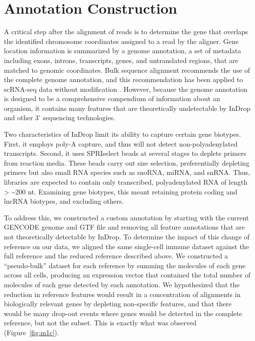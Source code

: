 \section{Annotation Construction}

A critical step after the alignment of reads is to determine the gene that overlaps the identified chromosome coordinates assigned to a read by the aligner. 
Gene location information is summarized by a genome annotation, a set of metadata including exons, introns, transcripts, genes, and untranslated regions, that are matched to genomic coordinates. 
Bulk sequence alignment recommends the use of the complete genome annotation, and this recommendation has been applied to scRNA-seq data without modification \citep{Shalek2014,Jaitin2014,Klein2015,Macosko2015}. 
However, because the genome annotation is designed to be a comprehensive compendium of information about an organism, it contains many features that are theoretically undetectable by InDrop and other 3' sequencing technologies.

Two characteristics of InDrop limit its ability to capture certain gene biotypes. 
First, it employs poly-A capture, and thus will not detect non-polyadenylated transcripts. Second, it uses SPRIselect beads at several stages to deplete primers from reaction media. 
These beads carry out size selection, preferentially depleting primers but also small RNA species such as snoRNA, miRNA, and snRNA\@. Thus, libraries are expected to contain only transcribed, polyadenylated RNA of length \textgreater{} \textasciitilde{}200 nt. 
Examining gene biotypes, this meant retaining protein coding and lncRNA biotypes, and excluding others.

To address this, we constructed a custom annotation by starting with the current GENCODE genome and GTF file and removing all feature annotations that are not theoretically detectable by InDrop.
To determine the impact of this change of reference on our data, we aligned the same single-cell immune dataset against the full reference and the reduced reference described above. 
We constructed a ``pseudo-bulk'' dataset for each reference by summing the molecules of each gene across all cells, producing an expression vector that contained the total number of molecules of each gene detected by each annotation. 
We hypothesized that the reduction in reference features would result in a concentration of alignments in biologically relevant genes by depleting non-specific features, and that there would be many drop-out events where genes would be detected in the complete reference, but not the subset.
This is exactly what was observed (Figure~\ref{fig:m1c}).

